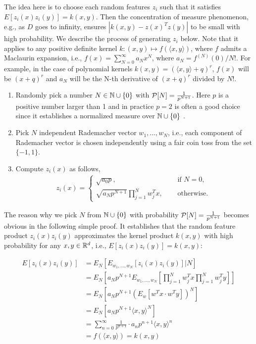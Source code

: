 The idea here is to choose each random features $z_i$ such that it satisfies
$E[z_i(x)z_i(y)] = k(x, y)$. Then the concentration of measure phenomenon, e.g.,
as $D$ goes to infinity, ensures $|k(x, y) - z(x)^Tz(y)|$ to be small with high
probability. We describe the process of generating $z_i$ below. Note that it
applies to any positive definite kernel
$k: (x, y) \mapsto f(\langle x, y \rangle)$,
where $f$ admits a Maclaurin expansion, i.e.,
$f(x) = \sum_{N=0}^{\infty} a_N x^N$,
where $a_N = f^{(N)}(0) / N!$.
For example, in the case of polynomial kernels
$k(x,y)=(\langle x,y\rangle+q)^r$, $f(x)$ will be
$(x + q)^r$ and $a_N$ will be the N-th derivative of $(x + q)^r$ divided by $N!$.

\begin{enumerate}
	\item Randomly pick a number $N \in \N \cup \{0\}$ with ${\cal P}[N] = \frac{1}{p^{N+1}}$.
    Here $p$ is a positive number larger than 1 and in practice $p=2$ is often a
    good choice since it establishes a normalized measure over $\N \cup \{0\}$ \cite{KK12}.
	\item Pick $N$ independent Rademacher vector $w_1, ..., w_N$, i.e., each
    component of Rademacher vector is chosen independently using a fair coin toss from the set $\{-1, 1\}$.
	\item Compute $z_i(x)$ as follows,
	\begin{align}
	\label{equ:svm-zi}
		z_i(x) =
		\begin{cases}
			\sqrt{a_0p}, &\quad \mbox{ if } N = 0,\\
			\sqrt{a_Np^{N+1}}\prod_{j=1}^N w_j^Tx, &\quad \mbox{ otherwise. }
		\end{cases}
	\end{align}
\end{enumerate}

The reason why we pick $N$ from $\N \cup \{0\}$ with probability ${\cal P}[N] =
\frac{1}{p^{N+1}}$ becomes obvious in the following simple proof. It establishes
that the random feature product $z_i(x)z_i(y)$ approximates the kernel product
$k(x, y)$ with high probability for any $x, y \in \mathbb{R}^d$, i.e., $E[z_i(x)z_i(y)]
= k(x, y)$:

\begin{align*}
    E[z_i(x)z_i(y)]
    &= E_N [E_{w_1, ..., w_N} [z_i(x)z_i(y)] | N]  \\
    &= E_N[a_N p^{N+1} E_{w_1, ..., w_N} [\prod_{j=1}^N w_j^T x \prod_{j=1}^N w_j^T y]] \\
    &= E_N[a_N p^{N+1} (E_{w} [w^Tx \cdot w^Ty])^N] \\
    &= E_N[a_N p^{N+1} \langle x, y \rangle^N] \\
    &= \sum_{n=0}^{\infty} \frac{1}{p^{n+1}} \cdot a_n p^{n+1} \langle x, y \rangle^n \\
    &= f(\langle x, y \rangle) = k(x, y)
\end{align*}

